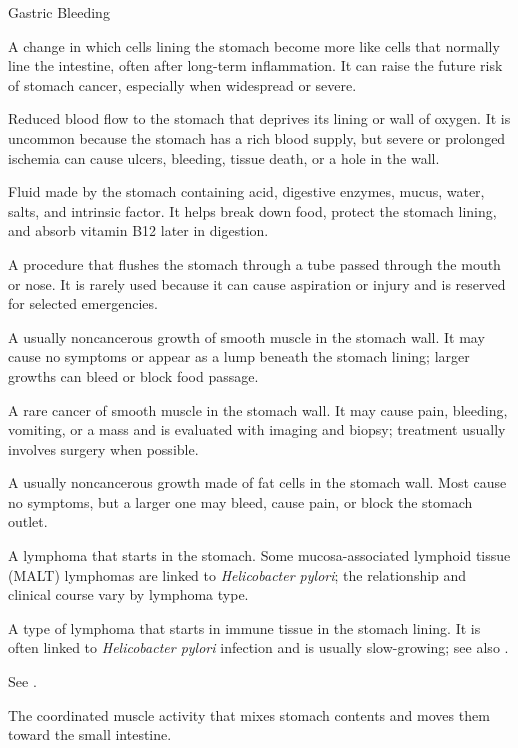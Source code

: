 \synonyms
Gastric Bleeding

 A change in which cells lining the stomach become more like cells that normally line the intestine, often after long-term inflammation. It can raise the future risk of stomach cancer, especially when widespread or severe.

 Reduced blood flow to the stomach that deprives its lining or wall of oxygen. It is uncommon because the stomach has a rich blood supply, but severe or prolonged ischemia can cause ulcers, bleeding, tissue death, or a hole in the wall.

 Fluid made by the stomach containing acid, digestive enzymes, mucus, water, salts, and intrinsic factor. It helps break down food, protect the stomach lining, and absorb vitamin B12 later in digestion.

 A procedure that flushes the stomach through a tube passed through the mouth or nose. It is rarely used because it can cause aspiration or injury and is reserved for selected emergencies.

 A usually noncancerous growth of smooth muscle in the stomach wall. It may cause no symptoms or appear as a lump beneath the stomach lining; larger growths can bleed or block food passage.

 A rare cancer of smooth muscle in the stomach wall. It may cause pain, bleeding, vomiting, or a mass and is evaluated with imaging and biopsy; treatment usually involves surgery when possible.

 A usually noncancerous growth made of fat cells in the stomach wall. Most cause no symptoms, but a larger one may bleed, cause pain, or block the stomach outlet.

 A lymphoma that starts in the stomach. Some mucosa-associated lymphoid tissue (MALT) lymphomas are linked to \textit{Helicobacter pylori}; the relationship and clinical course vary by lymphoma type.

 A type of lymphoma that starts in immune tissue in the stomach lining. It is often linked to \textit{Helicobacter pylori} infection and is usually slow-growing; see also .

 See .

 The coordinated muscle activity that mixes stomach contents and moves them toward the small intestine.

